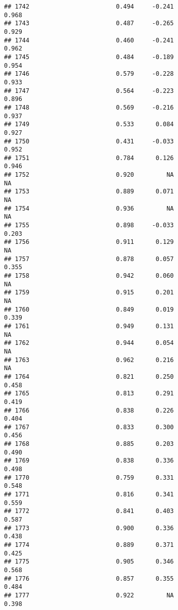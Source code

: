 \documentclass[
]{article}
\begin{document}
\begin{verbatim}
## 1742                        0.494     -0.241                     0.968
## 1743                        0.487     -0.265                     0.929
## 1744                        0.460     -0.241                     0.962
## 1745                        0.484     -0.189                     0.954
## 1746                        0.579     -0.228                     0.933
## 1747                        0.564     -0.223                     0.896
## 1748                        0.569     -0.216                     0.937
## 1749                        0.533      0.084                     0.927
## 1750                        0.431     -0.033                     0.952
## 1751                        0.784      0.126                     0.946
## 1752                        0.920         NA                        NA
## 1753                        0.889      0.071                        NA
## 1754                        0.936         NA                        NA
## 1755                        0.898     -0.033                     0.203
## 1756                        0.911      0.129                        NA
## 1757                        0.878      0.057                     0.355
## 1758                        0.942      0.060                        NA
## 1759                        0.915      0.201                        NA
## 1760                        0.849      0.019                     0.339
## 1761                        0.949      0.131                        NA
## 1762                        0.944      0.054                        NA
## 1763                        0.962      0.216                        NA
## 1764                        0.821      0.250                     0.458
## 1765                        0.813      0.291                     0.419
## 1766                        0.838      0.226                     0.404
## 1767                        0.833      0.300                     0.456
## 1768                        0.885      0.203                     0.490
## 1769                        0.838      0.336                     0.498
## 1770                        0.759      0.331                     0.548
## 1771                        0.816      0.341                     0.559
## 1772                        0.841      0.403                     0.587
## 1773                        0.900      0.336                     0.438
## 1774                        0.889      0.371                     0.425
## 1775                        0.905      0.346                     0.568
## 1776                        0.857      0.355                     0.484
## 1777                        0.922         NA                     0.398

\end{verbatim}
\end{document}
